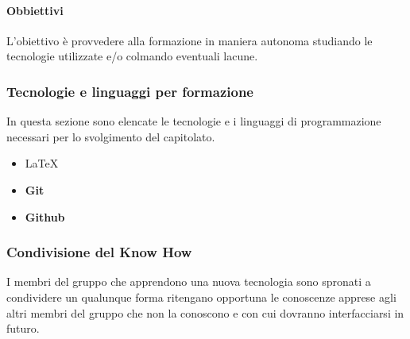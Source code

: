 			\paragraph{Obbiettivi}
				L'obiettivo è provvedere alla formazione in maniera autonoma studiando le tecnologie utilizzate e/o colmando eventuali lacune.
		\subsubsection{Tecnologie e linguaggi per formazione}
			In questa sezione sono elencate le tecnologie e i linguaggi di programmazione necessari per lo svolgimento del capitolato.
			\begin{itemize}
				\item\LaTeX
				\item\textbf{Git}
				\item\textbf{Github}
			\end{itemize}
		\subsubsection{Condivisione del Know How}
			I membri del gruppo che apprendono una nuova tecnologia sono spronati a condividere un qualunque forma ritengano opportuna le conoscenze apprese agli altri membri del gruppo che non la conoscono e con cui dovranno interfacciarsi in futuro.




			
			
			
			
			
			
			
			
			
			
			
			
			
			
			
			